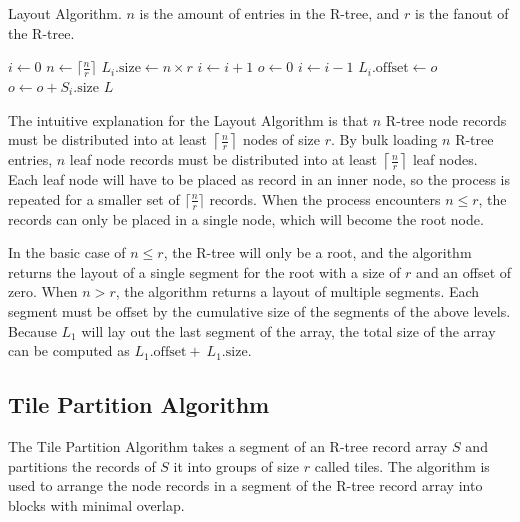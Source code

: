 \begin{algorithm}
  \caption{Layout Algorithm. \(n\) is the amount of entries in the R-tree, and \(r\) is the fanout of the R-tree.}
  \label{alg/layout}
  \begin{algorithmic}[1]
      \State \(i \gets 0\)
      \Repeat
        \State \(n \gets \lceil \frac{n}{r} \rceil\)
        \State \(L_i.\mathrm{size} \gets n \times r\)
        \State \(i \gets i + 1\)
      \State \(o \gets 0\)
      \Repeat
        \State \(i \gets i - 1\)
        \State \(L_i.\mathrm{offset} \gets o\)
        \State \(o \gets o + S_i.\mathrm{size}\)
      \State \Return \(L\)
    \EndFunction
  \end{algorithmic}
\end{algorithm}

The intuitive explanation for the Layout Algorithm is that \(n\) R-tree node records must be distributed into at least \(\left\lceil \frac{n}{r} \right\rceil\) nodes of size \(r\). By bulk loading \(n\) R-tree entries, \(n\) leaf node records must be distributed into at least \(\left\lceil \frac{n}{r} \right\rceil\) leaf nodes. Each leaf node will have to be placed as record in an inner node, so the process is repeated for a smaller set of \(\lceil \frac{n}{r} \rceil\) records. When the process encounters \(n \leq r\), the records can only be placed in a single node, which will become the root node.

In the basic case of \(n \leq r\), the R-tree will only be a root, and the algorithm returns the layout of a single segment for the root with a size of \(r\) and an offset of zero. When \(n > r\), the algorithm returns a layout of multiple segments. Each segment must be offset by the cumulative size of the segments of the above levels. Because \(L_1\) will lay out the last segment of the array, the total size of the array can be computed as \(L_1.\mathrm{offset} + \ L_1.\mathrm{size}\).

\subsection{Tile Partition Algorithm}

The Tile Partition Algorithm takes a segment of an R-tree record array \(S\) and partitions the records of \(S\) it into groups of size \(r\) called tiles. The algorithm is used to arrange the node records in a segment of the R-tree record array into blocks with minimal overlap.

